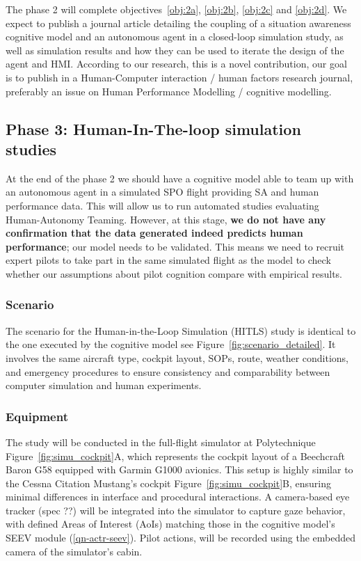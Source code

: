 \documentclass[12pt,a4paper]{article} %
\begin{document}
	The phase 2 will complete objectives~\ref{obj:2a}, \ref{obj:2b}, \ref{obj:2c} and \ref{obj:2d}. We expect to publish a journal article detailing the coupling of a situation awareness cognitive model and an autonomous agent in a closed-loop simulation study, as well as simulation results and how they can be used to iterate the design of the agent and HMI. According to our research, this is a novel contribution, our goal is to publish in a Human-Computer interaction / human factors research journal, preferably an issue on Human Performance Modelling / cognitive modelling.

	\subsection{Phase 3: Human-In-The-loop simulation studies}
	At the end of the phase 2 we should have a cognitive model able to team up with an autonomous agent in a simulated SPO flight providing SA and human performance data. This will allow us to run automated studies evaluating Human-Autonomy Teaming. However, at this stage, \textbf{we do not have any confirmation that the data generated indeed predicts human performance}; our model needs to be validated. This means we need to recruit expert pilots to take part in the same simulated flight as the model to check whether our assumptions about pilot cognition compare with empirical results.

	\subsubsection{Scenario}
	The scenario for the Human-in-the-Loop Simulation (HITLS) study is identical to the one executed by the cognitive model see Figure~\ref{fig:scenario_detailed}. It involves the same aircraft type, cockpit layout, SOPs, route, weather conditions, and emergency procedures to ensure consistency and comparability between computer simulation and human experiments.

	\subsubsection{Equipment}
	The study will be conducted in the full-flight simulator at Polytechnique Figure~\ref{fig:simu_cockpit}A, which represents the cockpit layout of a Beechcraft Baron G58 equipped with Garmin G1000 avionics. This setup is highly similar to the Cessna Citation Mustang's cockpit Figure~\ref{fig:simu_cockpit}B, ensuring minimal differences in interface and procedural interactions. A camera-based eye tracker (spec ??) will be integrated into the simulator to capture gaze behavior, with defined Areas of Interest (AoIs) matching those in the cognitive model's SEEV module (\ref{qn-actr-seev}). Pilot actions, will be recorded using the embedded camera of the simulator's cabin.
\end{document}
